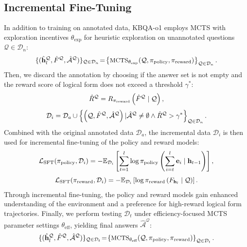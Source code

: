 \documentclass{article}
\theoremstyle{plain}
\theoremstyle{definition}
\theoremstyle{remark}
\begin{document}
\subsection{Incremental Fine-Tuning}
\label{Section3.3}
In addition to training on annotated data, KBQA-o1 employs MCTS with exploration incentives $\theta_{\text{exp}}$ for heuristic exploration on unannotated questions $\mathcal{Q} \in \mathcal{D}_n$:
\begin{equation}
\small
    \{(\hat{\mathbf{h}}_l^{\mathcal{Q}},\hat{F}^{\mathcal{Q}},\hat{\mathcal{A}}^{\mathcal{Q}})\}_{\mathcal{Q} \in \mathcal{D}_n}\!=\!\left\{\text{MCTS}_{\theta_{\text{exp}}}\!\left(\mathcal{Q},\pi_{\text{policy}},\pi_{\text{reward}}\right)\right\}_{\mathcal{Q} \in \mathcal{D}_n}. 
\end{equation}
Then, we discard the annotation by choosing if the answer set is not empty and the reward score of logical form does not exceed a threshold $\gamma^*$:
\begin{equation}
\small
\hat{R}^{\mathcal{Q}}=R_{\pi_{\text{reward}}}\left(\hat{F}^{\mathcal{Q}} \mid \mathcal{Q}\right),
\end{equation}
\begin{equation}
\small
    \mathcal{D}_i=\mathcal{D}_a\cup\left\{\left(\mathcal{Q},\hat{F}^{\mathcal{Q}},\hat{\mathcal{A}}^{\mathcal{Q}}\right)|\hat{\mathcal{A}}^{\mathcal{Q}}\neq\emptyset\land \hat{R}^{\mathcal{Q}}>\gamma^*\right\}_{\mathcal{Q} \in \mathcal{D}_n}.
\end{equation}
Combined with the original annotated data $\mathcal{D}_a$, the incremental data $\mathcal{D}_i$ is then used for incremental fine-tuning of the policy and reward models:
\begin{equation}
\small
    \mathcal{L}_{\text{SFT}}(\pi_{\text{policy}}, \mathcal{D}_i) = - \mathbb{E}_{\mathcal{D}_i} \left[ \sum_{t=1}^{l} \log \pi_{\text{policy}} \left(\sum_{i=t}^{l}\mathbf{e}_i \mid \mathbf{h}_{t-1}\right) \right],
\end{equation}
\begin{equation}
\small
    \mathcal{L}_{\text{SFT}}(\pi_{\text{reward}}, \mathcal{D}_i) = - \mathbb{E}_{\mathcal{D}_i} \left[ \log \pi_{\text{reward}} \left(F_{\mathbf{h}_l} \mid \mathcal{Q}\right) \right].
\end{equation}
Through incremental fine-tuning, the policy and reward models gain enhanced understanding of the environment and a preference for high-reward logical form trajectories. Finally, we perform testing $\mathcal{D}_t$ under efficiency-focused MCTS parameter settings $\theta_{\text{eff}}$, yielding final answers $\hat{\mathcal{A}}^{\mathcal{Q}}$:
\begin{equation}
\small
    \{(\hat{\mathbf{h}}_l^{\mathcal{Q}},\hat{F}^{\mathcal{Q}},\hat{\mathcal{A}}^{\mathcal{Q}})\}_{\mathcal{Q} \in \mathcal{D}_t}\!=\!\left\{\text{MCTS}_{\theta_{\text{eff}}}\!\left(\mathcal{Q},\pi_{\text{policy}},\pi_{\text{reward}}\right)\right\}_{\mathcal{Q} \in \mathcal{D}_t}. 
\end{equation}
\end{document}
